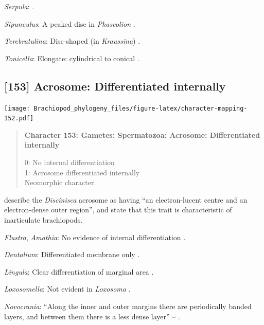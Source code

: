 \documentclass[openany]{book}
\begin{document}
\hypertarget{Serpula-coding-152}{}
\emph{Serpula}: \citet{Gherardi2011}.

\hypertarget{Sipunculus-coding-152}{}
\emph{Sipunculus}: A peaked disc in \emph{Phascolion} \citep{Rice1993}.

\hypertarget{Terebratulina-coding-152}{}
\emph{Terebratulina}: Disc-shaped (in \emph{Kraussina})
\citep{Hodgson1994Ultrastructureof}.

\hypertarget{Tonicella-coding-152}{}
\emph{Tonicella}: Elongate: cylindrical to conical
\citep{BucklandNicks1988}.

\subsection*{{[}153{]} Acrosome: Differentiated
internally}\label{acrosome-differentiated-internally}

\texttt{[image: Brachiopod\_phylogeny\_files/figure-latex/character-mapping-152.pdf]}

\begin{quote}
\textbf{Character 153: Gametes: Spermatozoa: Acrosome: Differentiated
internally}

0: No internal differentiation\\
1: Acrosome differentiated internally\\
Neomorphic character.
\end{quote}

\citet{Hodgson1994Ultrastructureof} describe the \emph{Discinisca}
acrosome as having ``an electron-lucent centre and an electron-dense
outer region'', and state that this trait is characteristic of
inarticulate brachiopods.

\hypertarget{Amathia-coding-153}{}
\emph{Flustra}, \emph{Amathia}: No evidence of internal differentiation
\citep[in \emph{Tubulipora};][]{Franzen1984}.

\hypertarget{Dentalium-coding-153}{}
\emph{Dentalium}: Differentiated membrane only \citep{DufresneDube1983}.

\hypertarget{Lingula-coding-153}{}
\emph{Lingula}: Clear differentiation of marginal area
\citep{Fukumoto2003Theacrosome}.

\hypertarget{Loxosomella-coding-153}{}
\emph{Loxosomella}: Not evident in \emph{Loxosoma} \citep{Franzen2000}.

\hypertarget{Novocrania-coding-153}{}
\emph{Novocrania}: ``Along the inner and outer margins there are
periodically banded layers, and between them there is a less dense
layer'' -- \citet{Afzelius1978Finestructure}.
\end{document}
